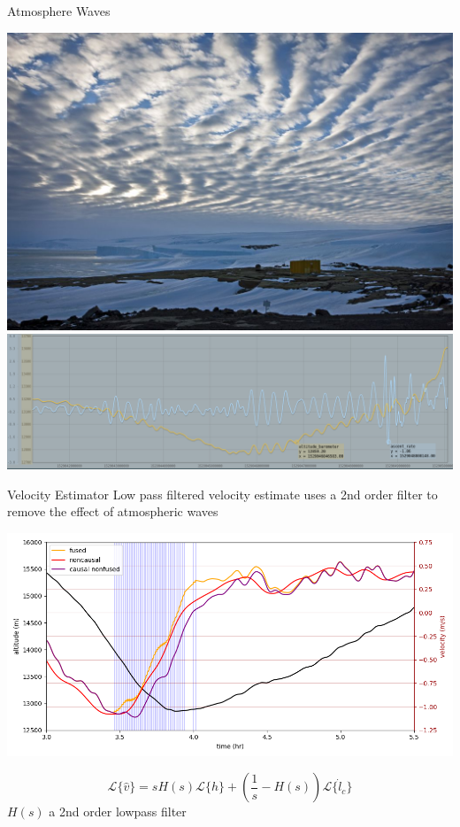 \documentclass[10pt,mathserif]{beamer}
\begin{document}
\begin{frame}{Atmosphere Waves}
\begin{center}
\includegraphics[width=.8\linewidth,trim={0 8cm 0 0cm},clip]{waves.jpg}
\includegraphics[width=.8\linewidth]{borgwaves.png}
\end{center}
\end{frame}

\begin{frame}{Velocity Estimator}
Low pass filtered velocity estimate uses a 2nd order filter to remove the effect of atmospheric waves
\begin{center}
\includegraphics[width=.8\linewidth,trim={10 0 10 0cm},clip]{est.png}
\end{center}
\vspace{-0.5cm}
\[ \mathcal{L}\{ \hat v \} = s H(s) \mathcal{L}\{h\} + \left(\frac{1}{s} - H(s) \right) \mathcal{L} \{\dot l_c\} \]
$H(s)$ a 2nd order lowpass filter\\
\end{frame}
\end{document}

